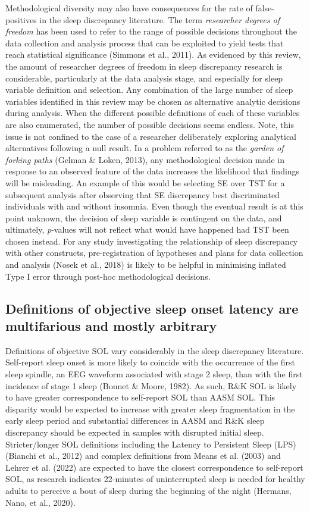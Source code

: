 \documentclass[
]{article}
\begin{document}
Methodological diversity may also have consequences for the rate of false-positives in the sleep discrepancy literature. The term \emph{researcher degrees of freedom} has been used to refer to the range of possible decisions throughout the data collection and analysis process that can be exploited to yield tests that reach statistical significance (Simmons et al., 2011). As evidenced by this review, the amount of researcher degrees of freedom in sleep discrepancy research is considerable, particularly at the data analysis stage, and especially for sleep variable definition and selection. Any combination of the large number of sleep variables identified in this review may be chosen as alternative analytic decisions during analysis. When the different possible definitions of each of these variables are also enumerated, the number of possible decisions seems endless. Note, this issue is not confined to the case of a researcher deliberately exploring analytical alternatives following a null result. In a problem referred to as the \emph{garden of forking paths} (Gelman \& Loken, 2013), any methodological decision made in response to an observed feature of the data increases the likelihood that findings will be misleading. An example of this would be selecting SE over TST for a subsequent analysis after observing that SE discrepancy best discriminated individuals with and without insomnia. Even though the eventual result is at this point unknown, the decision of sleep variable is contingent on the data, and ultimately, \emph{p}-values will not reflect what would have happened had TST been chosen instead. For any study investigating the relationship of sleep discrepancy with other constructs, pre-registration of hypotheses and plans for data collection and analysis (Nosek et al., 2018) is likely to be helpful in minimising inflated Type I error through post-hoc methodological decisions.

\subsection{Definitions of objective sleep onset latency are multifarious and mostly arbitrary}\label{sol}

Definitions of objective SOL vary considerably in the sleep discrepancy literature. Self-report sleep onset is more likely to coincide with the occurrence of the first sleep spindle, an EEG waveform associated with stage 2 sleep, than with the first incidence of stage 1 sleep (Bonnet \& Moore, 1982). As such, R\&K SOL is likely to have greater correspondence to self-report SOL than AASM SOL. This disparity would be expected to increase with greater sleep fragmentation in the early sleep period and substantial differences in AASM and R\&K sleep discrepancy should be expected in samples with disrupted initial sleep. Stricter/longer SOL definitions including the Latency to Persistent Sleep (LPS) (Bianchi et al., 2012) and complex definitions from Means et al. (2003) and Lehrer et al. (2022) are expected to have the closest correspondence to self-report SOL, as research indicates 22-minutes of uninterrupted sleep is needed for healthy adults to perceive a bout of sleep during the beginning of the night (Hermans, Nano, et al., 2020).
\end{document}
